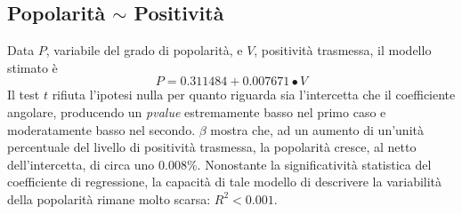 \documentclass[fleqn,10pt]{SelfArx} %
\begin{document}
\subsection*{Popolarità $\sim$ Positività}
Data $P$, variabile del grado di popolarità, e $V$, positività trasmessa, il modello stimato è
\begin{equation}
    P=0.311484+0.007671\bullet V
\end{equation}
Il test $t$ rifiuta l'ipotesi nulla per quanto riguarda sia l'intercetta che il coefficiente angolare, producendo un \textit{pvalue} estremamente basso nel primo caso e moderatamente basso nel secondo. $\beta$ mostra che, ad un aumento di un'unità percentuale del livello di positività trasmessa, la popolarità cresce, al netto dell'intercetta, di circa uno 0.008\%. Nonostante la significatività statistica del coefficiente di regressione, la capacità di tale modello di descrivere la variabilità della popolarità rimane molto scarsa: $R^2<0.001$.
\end{document}
